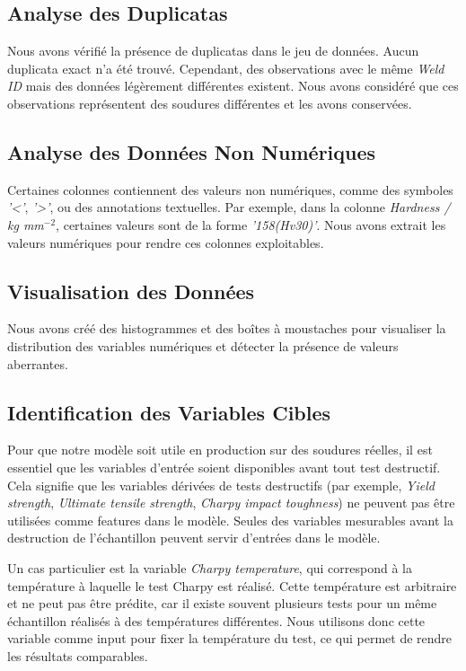 \documentclass{article}
\begin{document}
\subsection{Analyse des Duplicatas}

Nous avons vérifié la présence de duplicatas dans le jeu de données. Aucun duplicata exact n'a été trouvé. Cependant, des observations avec le même \textit{Weld ID} mais des données légèrement différentes existent. Nous avons considéré que ces observations représentent des soudures différentes et les avons conservées.

\subsection{Analyse des Données Non Numériques}

Certaines colonnes contiennent des valeurs non numériques, comme des symboles \textit{'<'}, \textit{'>'}, ou des annotations textuelles. Par exemple, dans la colonne \textit{Hardness / kg mm$^{-2}$}, certaines valeurs sont de la forme \textit{'158(Hv30)'}. Nous avons extrait les valeurs numériques pour rendre ces colonnes exploitables.

\subsection{Visualisation des Données}

Nous avons créé des histogrammes et des boîtes à moustaches pour visualiser la distribution des variables numériques et détecter la présence de valeurs aberrantes.

\subsection{Identification des Variables Cibles}

Pour que notre modèle soit utile en production sur des soudures réelles, il est essentiel que les variables d'entrée soient disponibles avant tout test destructif. Cela signifie que les variables dérivées de tests destructifs (par exemple, \textit{Yield strength}, \textit{Ultimate tensile strength}, \textit{Charpy impact toughness}) ne peuvent pas être utilisées comme features dans le modèle. Seules des variables mesurables avant la destruction de l'échantillon peuvent servir d'entrées dans le modèle.

Un cas particulier est la variable \textit{Charpy temperature}, qui correspond à la température à laquelle le test Charpy est réalisé. Cette température est arbitraire et ne peut pas être prédite, car il existe souvent plusieurs tests pour un même échantillon réalisés à des températures différentes. Nous utilisons donc cette variable comme input pour fixer la température du test, ce qui permet de rendre les résultats comparables.
\end{document}
